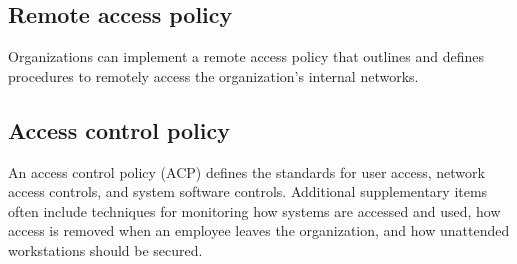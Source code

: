 \documentclass{article}
\begin{document}
\subsection*{Remote access policy}
Organizations can implement a remote access policy that outlines and defines procedures to remotely access the organization’s internal networks.

\subsection*{Access control policy}
An access control policy (ACP) defines the standards for user access, network access controls, and system software controls.
Additional supplementary items often include techniques for monitoring how systems are accessed and used, how access is removed when an employee leaves the organization, and how unattended workstations should be secured.

\nocite{*}


\end{document}
